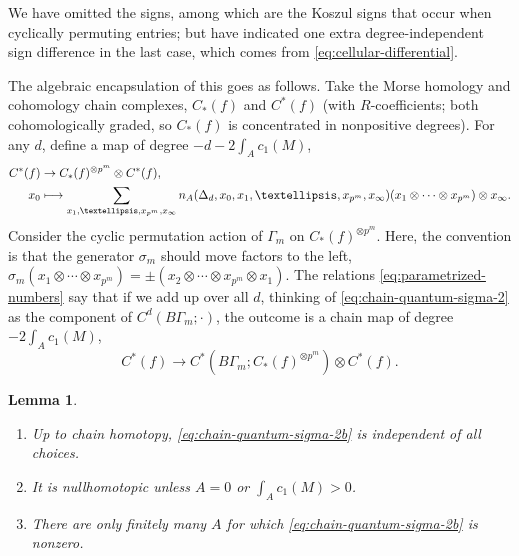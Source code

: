 \documentclass[10pt,a4paper]{amsart}
\newcommand{\skpt}{\par\smallskip}
\newcommand\mto{\mathchoice{\longmapsto}{\mapsto}{\mapsto}{\mapsto}}
\theoremstyle{plain}
\newtheorem{lemma}[theorem]{Lemma}
\theoremstyle{definition}
\begin{document}
We have omitted the signs, among which are the Koszul signs that occur when cyclically permuting entries; but have indicated one extra degree-independent sign difference in the last case, which comes from \eqref{eq:cellular-differential}.

The algebraic encapsulation of this goes as follows. Take the Morse homology and cohomology chain complexes, $C_*(f)$ and $C^*(f)$ (with $R$-coefficients; both cohomologically graded, so $C_*(f)$ is concentrated in nonpositive degrees). For any $d$, define a map of degree $-d-2\int_A c_1(M)$,
\begin{equation}\label{eq:chain-quantum-sigma-2}
\begin{aligned}
C^*(f) &\to C_*(f)^{\otimes p^m} \otimes C^*(f),
\\
x_0 &\mto \sum_{x_1,\dots,x_{p^m},x_\infty} n_A(\Delta_d,x_0,x_1,\dots,x_{p^m},x_\infty) (x_1 \otimes \cdots \otimes x_{p^m}) \otimes x_\infty.
\end{aligned}
\end{equation}
Consider the cyclic permutation action of $\Gamma_m$ on $C_*(f)^{\otimes p^m}$. Here, the convention is that the generator $\sigma_m$ should move factors to the left, $\sigma_m(x_1 \otimes \cdots \otimes x_{p^m}) = \pm (x_2 \otimes \cdots \otimes x_{p^m} \otimes x_1)$. The relations \eqref{eq:parametrized-numbers} say that if we add up over all $d$, thinking of \eqref{eq:chain-quantum-sigma-2} as the component of $C^d(B\Gamma_m;\cdot)$, the outcome is a chain map of degree $-2\int_A c_1(M)$,
\begin{equation}\label{eq:chain-quantum-sigma-2b}
C^*(f) \to C^*(B\Gamma_m;C_*(f)^{\otimes p^m}) \otimes C^*(f).
\end{equation}

\skpt
\begin{lemma} \label{th:gromov}
\begin{enumerate}
\item\label{th:gromovi}
Up to chain homotopy, \eqref{eq:chain-quantum-sigma-2b} is independent of all choices.

\item\label{th:gromovii}
It is nullhomotopic unless $A = 0$ or $\int_A c_1(M)>0$.

\item\label{th:gromoviii}
There are only finitely many $A$ for which \eqref{eq:chain-quantum-sigma-2b} is nonzero.
\end{enumerate}
\end{lemma}
\end{document}
